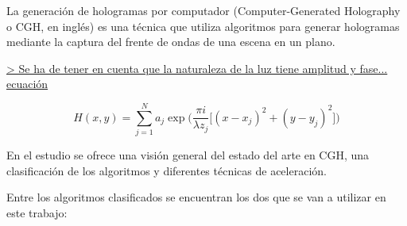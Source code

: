 \documentclass[10pt, a4paper]{article}
\begin{document}
La generación de hologramas por computador (Computer-Generated Holography o CGH, en inglés) es una técnica que utiliza algoritmos para generar hologramas mediante la captura del frente de ondas de una escena en un plano. 

\underline{ > Se ha de tener en cuenta que la naturaleza de la luz tiene amplitud y fase... ecuación}

$$
H(x,y) = \sum\limits_{j=1}^N a_j\exp\Big(\frac{\pi i}{\lambda z_j}\big[(x-x_j)^2 + (y-y_j)^2 \big]\Big)
$$

En el estudio \cite{Blinder:2022} se ofrece una visión general del estado del arte en CGH, una clasificación de los algoritmos y diferentes técnicas de aceleración.

Entre los algoritmos clasificados se encuentran los dos que se van a utilizar en este trabajo:
\end{document}
